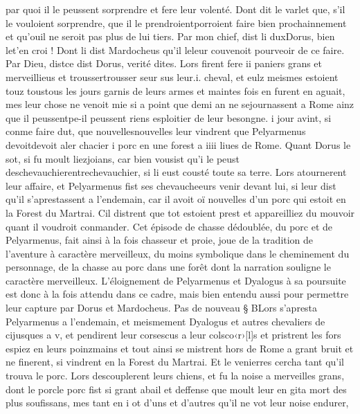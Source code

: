 \documentclass{article}
\begin{document}
\begin{pages}
   par quoi il le peussent sorprendre et fere leur volenté. 
   Dont dit le varlet que, 
   s’il le vouloient sorprendre, que il le 
      prendroientporroient faire bien prochainnement 
      et qu’ouil ne seroit pas plus de lui tiers.
   Par mon chief, dist 
      li duxDorus, bien 
      let'en croi !
   Dont li dist Mardocheus 
   qu’il leleur couvenoit 
      pourveoir de ce faire.
   Par Dieu, distce dist 
      Dorus, verité dites.
   Lors firent fere ii paniers grans et merveillieus et 
   troussertrousser seur sus 
   leur.i. cheval, 
   et eulz meismes estoient touz
      toustous les jours 
   garnis de leurs armes et maintes fois en furent en aguait, 
   mes leur chose ne venoit mie si a point que demi an ne sejournassent a Rome 
   ainz que il peussentpe-il peussent riens esploitier de leur besongne. 
   i jour avint, si conme faire dut, 
   que nouvellesnouvelles leur vindrent que 
   Pelyarmenus devoitdevoit aler chacier 
   i porc en une forest a iiii liues de 
   Rome. Quant Dorus
   le sot, si fu moult 
   liezjoians, 
   car bien vousist qu’i le peust deschevauchierentrechevauchier,
   si li eust cousté toute sa terre. 
   Lors atournerent leur affaire, et Pelyarmenus fist ses chevaucheeurs venir 
   devant lui, si leur dist qu’il s’aprestassent a l’endemain, car il avoit oï nouvelles 
      d’un porc qui estoit en la Forest du Martrai. 
   Cil distrent que tot estoient prest 
      et appareilliez du mouvoir quant il voudroit conmander.
Cet épisode de chasse dédoublée, du porc et de Pelyarmenus, fait ainsi à la fois chasseur et proie, 
joue de la tradition de l'aventure à caractère merveilleux, du moins symbolique dans le cheminement du personnage, de la chasse au porc
dans une forêt dont la narration souligne le caractère merveilleux. L'éloignement de Pelyarmenus et Dyalogus à sa poursuite est donc à 
la fois attendu dans ce cadre, mais bien entendu aussi pour permettre leur capture par Dorus et Mardocheus. \pend
\pstart Pas de nouveau § BLors s’apresta Pelyarmenus a l’endemain, 
   et meismement Dyalogus 
   et autres chevaliers de cijusques a v, et pendirent leur 
   corsescus a leur 
   colsco‹r›[l]s et pristrent 
   les fors espiez en leurs 
   poinzmains et tout ainsi se mistrent hors de 
   Rome a grant bruit et ne finerent, si vindrent en la 
   Forest du Martrai. 
   Et le venierres cercha tant qu’il trouva le porc. Lors descouplerent leurs chiens, et fu la noise a merveilles grans, 
   dont le porcle porc fist si grant abail et deffense que moult 
   leur en gita mort des plus soufissans, 
   mes tant en i ot d’uns et d’autres qu’il ne vot leur noise endurer, 

\end{pages}
\end{document}
